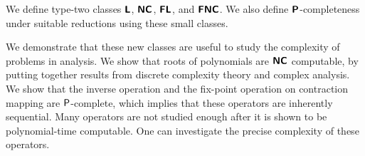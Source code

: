 \documentclass[envcountsame,orivec,oribibl]{llncs}
\begin{document}
We define type-two classes $\text{\bfseries \sffamily \upshape L}$, $\text{\bfseries \sffamily \upshape NC}$, $\text{\bfseries \sffamily \upshape FL}$,
and $\text{\bfseries \sffamily \upshape FNC}$.
We also define $\text{\bfseries \sffamily \upshape P}$-completeness 
under suitable reductions using these small classes.


We demonstrate that these new classes are useful to study the complexity 
of problems in analysis.
We show that roots of polynomials are $\text{\bfseries \sffamily \upshape NC}$ computable,
by putting together results from discrete complexity theory and
 complex analysis.
We show that the inverse operation and the fix-point operation on contraction mapping are $\mathsf{P}$-complete, which implies that these operators are inherently sequential.
Many operators are not studied enough after it is shown to be polynomial-time
computable.
One can investigate the precise complexity of these operators.





\end{document}
